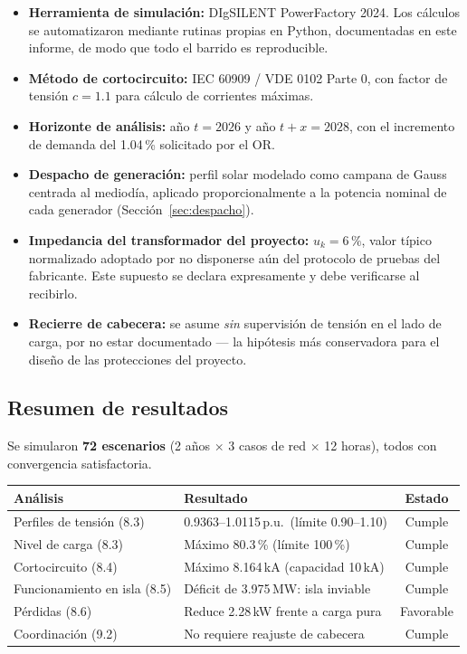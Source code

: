 \documentclass[11pt,a4paper]{article}
\begin{document}
\begin{itemize}
\item \textbf{Herramienta de simulaci\'on:} DIgSILENT PowerFactory 2024. Los
c\'alculos se automatizaron mediante rutinas propias en Python, documentadas en
este informe, de modo que todo el barrido es reproducible.
\item \textbf{M\'etodo de cortocircuito:} IEC 60909 / VDE 0102 Parte 0, con
factor de tensi\'on $c=1.1$ para c\'alculo de corrientes m\'aximas.
\item \textbf{Horizonte de an\'alisis:} a\~no $t=2026$ y a\~no $t+x=2028$, con el
incremento de demanda del 1.04\,\% solicitado por el OR.
\item \textbf{Despacho de generaci\'on:} perfil solar modelado como campana de
Gauss centrada al mediod\'ia, aplicado proporcionalmente a la potencia nominal de
cada generador (Secci\'on~\ref{sec:despacho}).
\item \textbf{Impedancia del transformador del proyecto:} $u_k = 6\,\%$, valor
t\'ipico normalizado adoptado por no disponerse a\'un del protocolo de pruebas del
fabricante. Este supuesto se declara expresamente y debe verificarse al
recibirlo.
\item \textbf{Recierre de cabecera:} se asume \emph{sin} supervisi\'on de tensi\'on
en el lado de carga, por no estar documentado --- la hip\'otesis m\'as
conservadora para el dise\~no de las protecciones del proyecto.
\end{itemize}

\subsection*{Resumen de resultados}

Se simularon \textbf{72 escenarios} (2 a\~nos $\times$ 3 casos de red $\times$ 12
horas), todos con convergencia satisfactoria.

\begin{center}
\begin{tabular}{|l|l|c|}
\hline
\textbf{An\'alisis} & \textbf{Resultado} & \textbf{Estado} \\ \hline
Perfiles de tensi\'on (8.3) & 0.9363--1.0115\,p.u.\ (l\'imite 0.90--1.10) & Cumple \\ \hline
Nivel de carga (8.3) & M\'aximo 80.3\,\% (l\'imite 100\,\%) & Cumple \\ \hline
Cortocircuito (8.4) & M\'aximo 8.164\,kA (capacidad 10\,kA) & Cumple \\ \hline
Funcionamiento en isla (8.5) & D\'eficit de 3.975\,MW: isla inviable & Cumple \\ \hline
P\'erdidas (8.6) & Reduce 2.28\,kW frente a carga pura & Favorable \\ \hline
Coordinaci\'on (9.2) & No requiere reajuste de cabecera & Cumple \\ \hline
\end{tabular}
\end{center}
\end{document}
